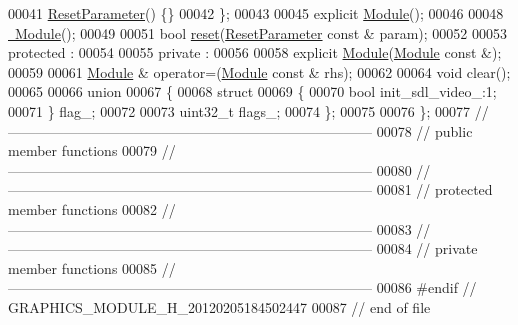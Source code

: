 \begin{DoxyCode}
00041         \hyperlink{structhryky_1_1graphics_1_1_module_1_1_reset_parameter}{ResetParameter}() \{\}
00042     \};
00043 
00045     \textcolor{keyword}{explicit} \hyperlink{classhryky_1_1graphics_1_1_module_a82d522acf9ff4225bf03a7d3dbf85843}{Module}();
00046 
00048     \hyperlink{classhryky_1_1graphics_1_1_module_a0abae9a343c3fc1bb8252247f926636a}{~Module}();
00049 
00051     \textcolor{keywordtype}{bool} \hyperlink{classhryky_1_1graphics_1_1_module_a5c8abe754f63338ef1f62392e93e3306}{reset}(\hyperlink{structhryky_1_1graphics_1_1_module_1_1_reset_parameter}{ResetParameter} \textcolor{keyword}{const} & param);
00052 
00053 \textcolor{keyword}{protected} :
00054 
00055 \textcolor{keyword}{private} :
00056 
00058     \textcolor{keyword}{explicit} \hyperlink{classhryky_1_1graphics_1_1_module_a82d522acf9ff4225bf03a7d3dbf85843}{Module}(\hyperlink{classhryky_1_1graphics_1_1_module}{Module} \textcolor{keyword}{const} &);
00059 
00061     \hyperlink{classhryky_1_1graphics_1_1_module}{Module} & operator=(\hyperlink{classhryky_1_1graphics_1_1_module}{Module} \textcolor{keyword}{const} & rhs);
00062 
00064     \textcolor{keywordtype}{void} clear();
00065 
00066     \textcolor{keyword}{union}
00067     \{
00068         \textcolor{keyword}{struct}
00069         \{
00070             \textcolor{keywordtype}{bool}    init\_sdl\_video\_:1;
00071         \} flag\_;
00072 
00073         uint32\_t flags\_;
00074     \};
00075 
00076 \};
00077 \textcolor{comment}{//
      ------------------------------------------------------------------------------}
00078 \textcolor{comment}{// public member functions}
00079 \textcolor{comment}{//
      ------------------------------------------------------------------------------}
00080 \textcolor{comment}{//
      ------------------------------------------------------------------------------}
00081 \textcolor{comment}{// protected member functions}
00082 \textcolor{comment}{//
      ------------------------------------------------------------------------------}
00083 \textcolor{comment}{//
      ------------------------------------------------------------------------------}
00084 \textcolor{comment}{// private member functions}
00085 \textcolor{comment}{//
      ------------------------------------------------------------------------------}
00086 \textcolor{preprocessor}{#endif // GRAPHICS\_MODULE\_H\_20120205184502447}
00087 \textcolor{preprocessor}{}\textcolor{comment}{// end of file}
\end{DoxyCode}

